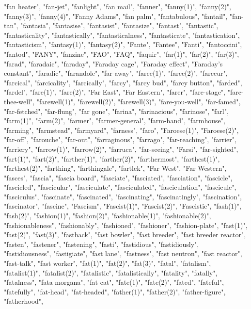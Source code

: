 "fan heater",
"fan-jet",
"fanlight",
"fan mail",
"fanner",
"fanny(1)",
"fanny(2)",
"fanny(3)",
"fanny(4)",
"Fanny Adams",
"fan palm",
"fantabulous",
"fantail",
"fan-tan",
"fantasia",
"fantasise",
"fantasist",
"fantasize",
"fantast",
"fantastic",
"fantasticality",
"fantastically",
"fantasticalness",
"fantasticate",
"fantastication",
"fantasticism",
"fantasy(1)",
"fantasy(2)",
"Fante",
"Fantee",
"Fanti",
"fantoccini",
"fantod",
"FANY",
"fanzine",
"FAO",
"FAQ",
"faquir",
"far(1)",
"far(2)",
"far(3)",
"farad",
"faradaic",
"faraday",
"Faraday cage",
"Faraday effect",
"Faraday's constant",
"faradic",
"farandole",
"far-away",
"farce(1)",
"farce(2)",
"farceur",
"farcical",
"farcicality",
"farcically",
"farcy",
"farcy bud",
"farcy button",
"farded",
"fardel",
"fare(1)",
"fare(2)",
"Far East",
"Far Eastern",
"farer",
"fare-stage",
"fare-thee-well",
"farewell(1)",
"farewell(2)",
"farewell(3)",
"fare-you-well",
"far-famed",
"far-fetched",
"far-flung",
"far gone",
"farina",
"farinacious",
"farinose",
"farl",
"farm(1)",
"farm(2)",
"farmer",
"farmer-general",
"farm-hand",
"farmhouse",
"farming",
"farmstead",
"farmyard",
"farness",
"faro",
"Faroese(1)",
"Faroese(2)",
"far-off",
"farouche",
"far-out",
"farraginous",
"farrago",
"far-reaching",
"farrier",
"farriery",
"farrow(1)",
"farrow(2)",
"farruca",
"far-seeing",
"Farsi",
"far-sighted",
"fart(1)",
"fart(2)",
"farther(1)",
"farther(2)",
"farthermost",
"farthest(1)",
"farthest(2)",
"farthing",
"farthingale",
"fartlek",
"Far West",
"Far Western",
"fasces",
"fascia",
"fascia board",
"fasciate",
"fasciated",
"fasciation",
"fascicle",
"fascicled",
"fascicular",
"fasciculate",
"fasciculated",
"fasciculation",
"fascicule",
"fasciculus",
"fascinate",
"fascinated",
"fascinating",
"fascinatingly",
"fascination",
"fascinator",
"fascine",
"Fascism",
"Fascist(1)",
"Fascist(2)",
"Fascistic",
"fash(1)",
"fash(2)",
"fashion(1)",
"fashion(2)",
"fashionable(1)",
"fashionable(2)",
"fashionableness",
"fashionably",
"fashioned",
"fashioner",
"fashion-plate",
"fast(1)",
"fast(2)",
"fast(3)",
"fastback",
"fast bowler",
"fast breeder",
"fast breeder reactor",
"fasten",
"fastener",
"fastening",
"fasti",
"fastidious",
"fastidiously",
"fastidiousness",
"fastigiate",
"fast lane",
"fastness",
"fast neutron",
"fast reactor",
"fast-talk",
"fast worker",
"fat(1)",
"fat(2)",
"fat(3)",
"fatal",
"fatalism",
"fatalist(1)",
"fatalist(2)",
"fatalistic",
"fatalistically",
"fatality",
"fatally",
"fatalness",
"fata morgana",
"fat cat",
"fate(1)",
"fate(2)",
"fated",
"fateful",
"fatefully",
"fat-head",
"fat-headed",
"father(1)",
"father(2)",
"father-figure",
"fatherhood",
